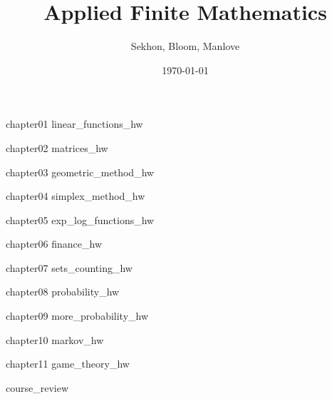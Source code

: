 \documentclass[12pt]{book}
\begin{document}

\frontmatter
\title{Applied Finite Mathematics}
\author{Sekhon, Bloom, Manlove}
\date{\today}
\maketitle
\tableofcontents


\mainmatter
{chapter01}
{linear_functions_hw}

{chapter02}
{matrices_hw}

{chapter03}
{geometric_method_hw}

{chapter04}
{simplex_method_hw}

{chapter05}
{exp_log_functions_hw}

{chapter06}
{finance_hw}

{chapter07}
{sets_counting_hw}

{chapter08}
{probability_hw}

{chapter09}
{more_probability_hw}

{chapter10}
{markov_hw}

{chapter11}
{game_theory_hw}

{course_review}


\backmatter
\end{document}
